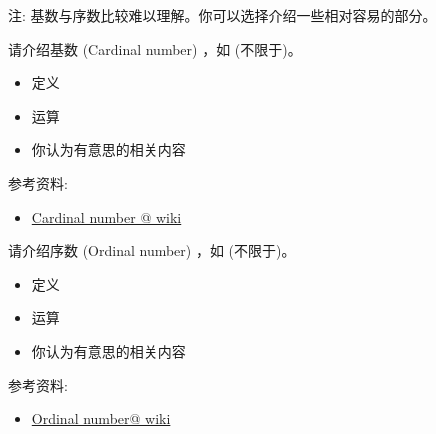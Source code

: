 \documentclass[a4paper, justified]{tufte-handout}
\begin{document}
\begin{solution}
\end{solution}

\beginot

注: 基数与序数比较难以理解。你可以选择介绍一些相对容易的部分。
\begin{ot}[基数]
  请介绍基数 (Cardinal number) ，如 (不限于)。
  \begin{itemize}
    \item 定义 
    \item 运算
    \item 你认为有意思的相关内容
  \end{itemize}

  \noindent 参考资料:
  \begin{itemize}
    \item \href{https://en.wikipedia.org/wiki/Cardinal\_number}{Cardinal number @ wiki}
  \end{itemize}
\end{ot}

\vspace{0.50cm}
\begin{ot}[序数]
  请介绍序数 (Ordinal number) ，如 (不限于)。
  \begin{itemize}
    \item 定义 
    \item 运算
    \item 你认为有意思的相关内容
  \end{itemize}

  \noindent 参考资料:
  \begin{itemize}
    \item \href{https://en.wikipedia.org/wiki/Ordinal\_number}{Ordinal number@ wiki}
  \end{itemize}
\end{ot}



\begincorrection


\beginfb

\end{document}
